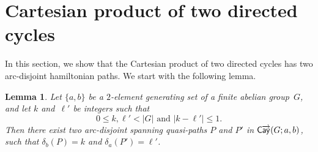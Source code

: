\documentclass[11pt]{amsart}
\newtheorem{lem}[equation]{Lemma}
\theoremstyle{definition}
\numberwithin{case}{startcases}
\numberwithin{equation}{section}
\newcommand{\cayd}{\mathop{\mathsf{C}\mkern-1mu\overrightarrow{\mathsf{ay}}}}
\begin{document}
	
	\section{Cartesian product of two directed cycles} \label{C1xC2Sect}
	
	In this section, we show that the Cartesian product of two directed cycles has two arc-disjoint hamiltonian paths. We start with the following lemma.
	
	\begin{lem} \label{makedisjoint}
		Let $\{a,b\}$ be a\/ $2$-element generating set of a finite abelian group~$G$, and let $k$ and~$\ell'$ be integers such that 
		\[ \text{$0 \le k,\ell' < |G|$ and $|k - \ell'| \le 1$.} \] 
		Then there exist two arc-disjoint spanning quasi-paths $P$ and $P'$ in $\cayd(G; a,b)$, such that $\delta_b (P) = k$ and $ \delta_a(P') = \ell'$.
	\end{lem}
	
\end{document}
